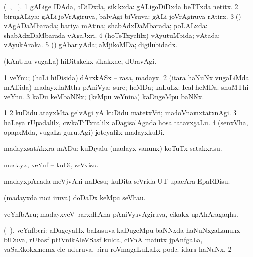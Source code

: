 {{{{{{\bentry 
{}
  \gl{\gu} (\tara\ , \tama\ ).\bmng
\bnum
\num{1} gALige IDAda, oDiDxda, sikikxda:  gALigoDiDxda beTTxda netitx. 
\num{2} birugALiya; gALi joVrAgiruva, balvAgi biVsuva:  gALi joVrAgiruva rAtirx. 
\num{3} (\AmA) vAgADaMbarada; bariya mAtina; shabAdxDaMbarada; poLALxda:  shabAdxDaMbarada vAgaJxri. 
\num{4} (hoTeTxyalilx) vAyutuMbida; vAtada; vAyukAraka. 
\num{5} (\AmA) gAbariyAda; aMjikoMDa; digilubidadx. 
\enum
\emng

\noindent
\gl{\pagu}
\bmng
{} (kAnUnu \mo vugaLa) hiDitakekx sikakxde, dUravAgi. 
\emng
\eentry

\bentry
{} 
\gl{\nA}
\expl{}
\bmng
\bnum
\num{1} veYnu; (huLi hiDisida) dArxkASx -- rasa, madayx. 
\num{2} (itara haNuNx \mo vugaLiMda mADida) madayxdaMtha pAniVya; sure; heMDa; kaLuLx:  Ical heMDa.  shuMThi veYnu. 
\num{3} kaDu keMbaNNx; (keMpu veYnina) kaDugeMpu baNNx. 
\enum
\emng

\noindent
\gl{\pagu}
\bmng
\bnum
\num{1}  
\num{2}  kuDidu atayxMta gelvAgi yA kuDidu matetxVri; madoVnamxtatxnAgi. 
\num{3}  haLeya rUpadalilx, cwkaTiTxnalilx aDagisalAgada hosa tatavxgaLu. 
\num{4}  (senxVha, opapxMda, \mo vugaLa gurutAgi) joteyalilx madayxkuDi. 
\enum
\emng
\eentry

 \bentry
{}
\gl{\sakirx}
\expl{}
\bmng
madayxsatAkxra mADu; kuDiyalu (madayx \mo vanunx) koTuTx satakxrisu. 
\emng

\noindent 
\gl{\akirx}
\expl{}
\bmng
madayx, veYnf -- kuDi, seVvisu. 
\emng

\noindent 
\gl{\pagu}
\bmng
{} madayxpAnada meVjvAni naDesu; kuDita seVrida UT upacAra EpaRDisu. 
\emng
\eentry

\bentry 
{}
  \gl{\nA}\bmng
(madayxda ruci iruva) doDaDx keMpu seVbau. 
\emng
\eentry

\bentry
{}
 \gl{\nA}\bmng
veYnfbAru; madayxveV parxdhAna pAniVyavAgiruva, cikakx upAhAragaqha. 
\emng
\eentry

\bentry
{}
  \gl{\nA} (\bava\ ).\bmng
\bnum
{} veYnfberi: 
\banum
{} aDugeyalilx baLasuva kaDugeMpu baNNxda haNuNxgaLanunx biDuva, rUbasf phiVnikAleVSasf kulda, ciVnA matutx jpAnfgaLa, vaSaRkokxmemx ele uduruva, biru roVmagaLuLaLx pode. 
 idara haNuNx. 
\eanum
\numie
\num{2} 
\enum
\emng
\eentry

}}}}}}
